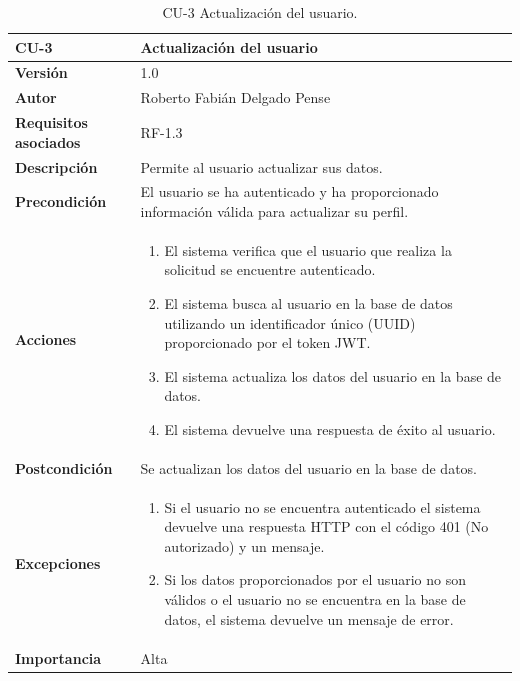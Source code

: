 \begin{table}[p]
	\centering
	\begin{tabularx}{\linewidth}{ p{} p{} }
		\toprule
		\textbf{CU-3}    & \textbf{Actualización del usuario}\\
		\toprule
		\textbf{Versión}              & 1.0    \\
		\textbf{Autor}                & Roberto Fabián Delgado Pense \\
		\textbf{Requisitos asociados} & RF-1.3 \\ 
		\textbf{Descripción}          & Permite al usuario actualizar sus datos. \\
		\textbf{Precondición}         & El usuario se ha autenticado y ha proporcionado información válida para                                             actualizar su perfil. \\
		\textbf{Acciones}             &
		\begin{enumerate}
			\def\labelenumi{\arabic{enumi}.}
			\tightlist
                \item El sistema verifica que el usuario que realiza la solicitud se encuentre autenticado.
			\item El sistema busca al usuario en la base de datos utilizando un identificador único (UUID)                      proporcionado por el token JWT.
                \item El sistema actualiza los datos del usuario en la base de datos.
                \item El sistema devuelve una respuesta de éxito al usuario.
            \end{enumerate}\\
		\textbf{Postcondición}        & Se actualizan los datos del usuario en la base de datos.\\
  		\textbf{Excepciones}          & 
                \begin{enumerate}
			\def\labelenumi{\arabic{enumi}.}
			\tightlist
			\item Si el usuario no se encuentra autenticado el sistema devuelve una respuesta HTTP con el código 401 (No autorizado) y un mensaje.
                \item Si los datos proporcionados por el usuario no son válidos o el usuario no se                           encuentra en la base de datos, el sistema devuelve un mensaje de error. 
            \end{enumerate} \\
		\textbf{Importancia}          & Alta \\
		\bottomrule
	\end{tabularx}
	\caption{CU-3 Actualización del usuario.}
\end{table}

